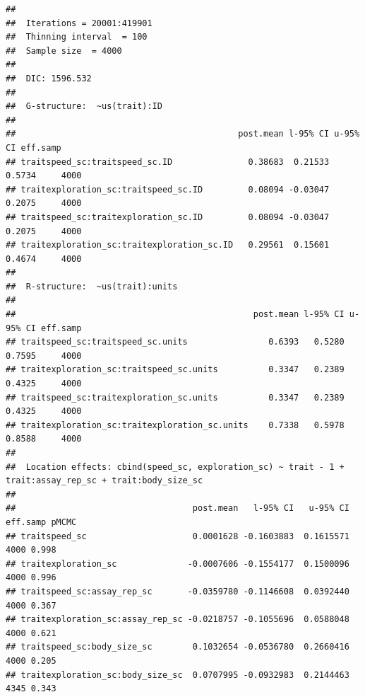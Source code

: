 \documentclass[
  12pt,
]{book}
\newenvironment{Shaded}{\begin{snugshade}}{\end{snugshade}}
\newcommand{\DecValTok}[1]{\textcolor[rgb]{0.00,0.00,0.81}{#1}}
\newcommand{\KeywordTok}[1]{\textcolor[rgb]{0.13,0.29,0.53}{\textbf{#1}}}
\newcommand{\NormalTok}[1]{#1}
\newcommand{\OperatorTok}[1]{\textcolor[rgb]{0.81,0.36,0.00}{\textbf{#1}}}
\newcommand{\StringTok}[1]{\textcolor[rgb]{0.31,0.60,0.02}{#1}}
\begin{document}
\begin{verbatim}
## 
##  Iterations = 20001:419901
##  Thinning interval  = 100
##  Sample size  = 4000 
## 
##  DIC: 1596.532 
## 
##  G-structure:  ~us(trait):ID
## 
##                                            post.mean l-95% CI u-95% CI eff.samp
## traitspeed_sc:traitspeed_sc.ID               0.38683  0.21533   0.5734     4000
## traitexploration_sc:traitspeed_sc.ID         0.08094 -0.03047   0.2075     4000
## traitspeed_sc:traitexploration_sc.ID         0.08094 -0.03047   0.2075     4000
## traitexploration_sc:traitexploration_sc.ID   0.29561  0.15601   0.4674     4000
## 
##  R-structure:  ~us(trait):units
## 
##                                               post.mean l-95% CI u-95% CI eff.samp
## traitspeed_sc:traitspeed_sc.units                0.6393   0.5280   0.7595     4000
## traitexploration_sc:traitspeed_sc.units          0.3347   0.2389   0.4325     4000
## traitspeed_sc:traitexploration_sc.units          0.3347   0.2389   0.4325     4000
## traitexploration_sc:traitexploration_sc.units    0.7338   0.5978   0.8588     4000
## 
##  Location effects: cbind(speed_sc, exploration_sc) ~ trait - 1 + trait:assay_rep_sc + trait:body_size_sc 
## 
##                                   post.mean   l-95% CI   u-95% CI eff.samp pMCMC
## traitspeed_sc                     0.0001628 -0.1603883  0.1615571     4000 0.998
## traitexploration_sc              -0.0007606 -0.1554177  0.1500096     4000 0.996
## traitspeed_sc:assay_rep_sc       -0.0359780 -0.1146608  0.0392440     4000 0.367
## traitexploration_sc:assay_rep_sc -0.0218757 -0.1055696  0.0588048     4000 0.621
## traitspeed_sc:body_size_sc        0.1032654 -0.0536780  0.2660416     4000 0.205
## traitexploration_sc:body_size_sc  0.0707995 -0.0932983  0.2144463     4345 0.343
\end{verbatim}

\begin{Shaded}
\end{Shaded}
\end{document}
